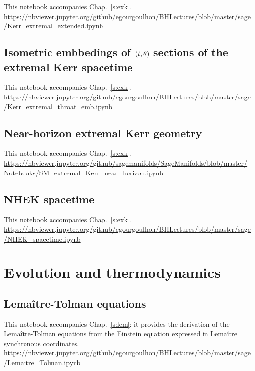 This notebook accompanies Chap.~\ref{s:exk}.\\[1ex]
{\footnotesize
\url{https://nbviewer.jupyter.org/github/egourgoulhon/BHLectures/blob/master/sage/Kerr_extremal_extended.ipynb}
}

\subsection{Isometric embbedings of $(t,\theta)$ sections of the extremal Kerr spacetime} \label{s:sam:Kerr_extremal_throat_emb}

This notebook accompanies Chap.~\ref{s:exk}.\\[1ex]
{\footnotesize
\url{https://nbviewer.jupyter.org/github/egourgoulhon/BHLectures/blob/master/sage/Kerr_extremal_throat_emb.ipynb}
}

\subsection{Near-horizon extremal Kerr geometry} \label{s:sam:NEHK}

This notebook accompanies Chap.~\ref{s:exk}.\\[1ex]
{\footnotesize
\url{https://nbviewer.jupyter.org/github/sagemanifolds/SageManifolds/blob/master/Notebooks/SM_extremal_Kerr_near_horizon.ipynb}
}

\subsection{NHEK spacetime} \label{s:sam:NEHK_spacetime}

This notebook accompanies Chap.~\ref{s:exk}.\\[1ex]
{\footnotesize
\url{https://nbviewer.jupyter.org/github/egourgoulhon/BHLectures/blob/master/sage/NHEK_spacetime.ipynb}
}




\section{Evolution and thermodynamics}

\subsection{Lemaître-Tolman equations} \label{s:sam:Lemaitre_Tolman}

This notebook accompanies Chap.~\ref{s:lem}: it provides the derivation
of the Lemaître-Tolman equations from the Einstein equation expressed in
Lemaître synchronous coordinates.\\[1ex]
{\footnotesize
\url{https://nbviewer.jupyter.org/github/egourgoulhon/BHLectures/blob/master/sage/Lemaitre_Tolman.ipynb}
}

